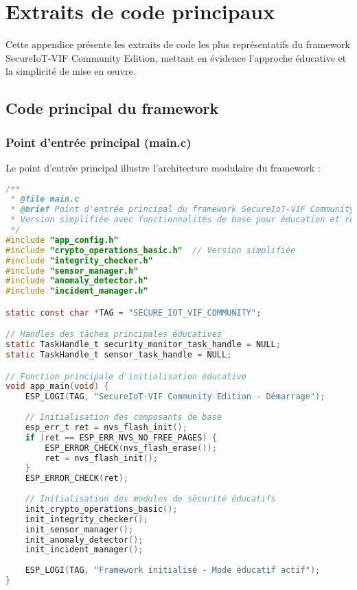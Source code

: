 
\appendix

\chapter{Extraits de code principaux}
\label{app:code}

Cette appendice présente les extraits de code les plus représentatifs du framework SecureIoT-VIF Community Edition, mettant en évidence l'approche éducative et la simplicité de mise en œuvre.

\section{Code principal du framework}

\subsection{Point d'entrée principal (main.c)}

Le point d'entrée principal illustre l'architecture modulaire du framework :

\begin{lstlisting}[language=C, caption={Structure principale du framework - main.c}, label=lst:main-structure]
/**
 * @file main.c
 * @brief Point d'entrée principal du framework SecureIoT-VIF Community Edition
 * Version simplifiée avec fonctionnalités de base pour éducation et recherche.
 */
#include "app_config.h"
#include "crypto_operations_basic.h"  // Version simplifiée
#include "integrity_checker.h"
#include "sensor_manager.h"
#include "anomaly_detector.h"
#include "incident_manager.h"

static const char *TAG = "SECURE_IOT_VIF_COMMUNITY";

// Handles des tâches principales éducatives
static TaskHandle_t security_monitor_task_handle = NULL;
static TaskHandle_t sensor_task_handle = NULL;

// Fonction principale d'initialisation éducative
void app_main(void) {
    ESP_LOGI(TAG, "SecureIoT-VIF Community Edition - Démarrage");
    
    // Initialisation des composants de base
    esp_err_t ret = nvs_flash_init();
    if (ret == ESP_ERR_NVS_NO_FREE_PAGES) {
        ESP_ERROR_CHECK(nvs_flash_erase());
        ret = nvs_flash_init();
    }
    ESP_ERROR_CHECK(ret);
    
    // Initialisation des modules de sécurité éducatifs
    init_crypto_operations_basic();
    init_integrity_checker();
    init_sensor_manager();
    init_anomaly_detector();
    init_incident_manager();
    
    ESP_LOGI(TAG, "Framework initialisé - Mode éducatif actif");
}
\end{lstlisting}

